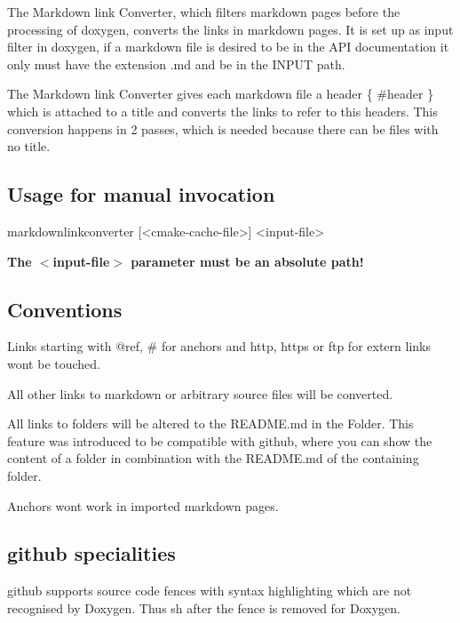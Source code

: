 The Markdown link Converter, which filters markdown pages before the processing of doxygen, converts the links in markdown pages. It is set up as input filter in doxygen, if a markdown file is desired to be in the A\+P\+I documentation it only must have the extension {\ttfamily .md} and be in the {\ttfamily I\+N\+P\+U\+T} path.

The Markdown link Converter gives each markdown file a header {\ttfamily \{ \#header \}} which is attached to a title and converts the links to refer to this headers. This conversion happens in 2 passes, which is needed because there can be files with no title.

\subsection*{Usage for manual invocation}

\begin{DoxyVerb}    markdownlinkconverter [<cmake-cache-file>] <input-file>
\end{DoxyVerb}


{\bfseries The $<$input-\/file$>$ parameter must be an absolute path!}

\subsection*{Conventions}


\begin{DoxyItemize}
\item Links starting with {\ttfamily @ref}, {\ttfamily \#} for anchors and {\ttfamily http}, {\ttfamily https} or {\ttfamily ftp} for extern links wont be touched.
\item All other links to markdown or arbitrary source files will be converted.
\item All links to folders will be altered to the R\+E\+A\+D\+M\+E.\+md in the Folder. This feature was introduced to be compatible with github, where you can show the content of a folder in combination with the R\+E\+A\+D\+M\+E.\+md of the containing folder.
\item Anchors wont work in imported markdown pages.
\end{DoxyItemize}

\subsection*{github specialities}


\begin{DoxyItemize}
\item github supports source code fences with syntax highlighting which are not recognised by Doxygen. Thus {\ttfamily sh} after the fence is removed for Doxygen.
\end{DoxyItemize}

